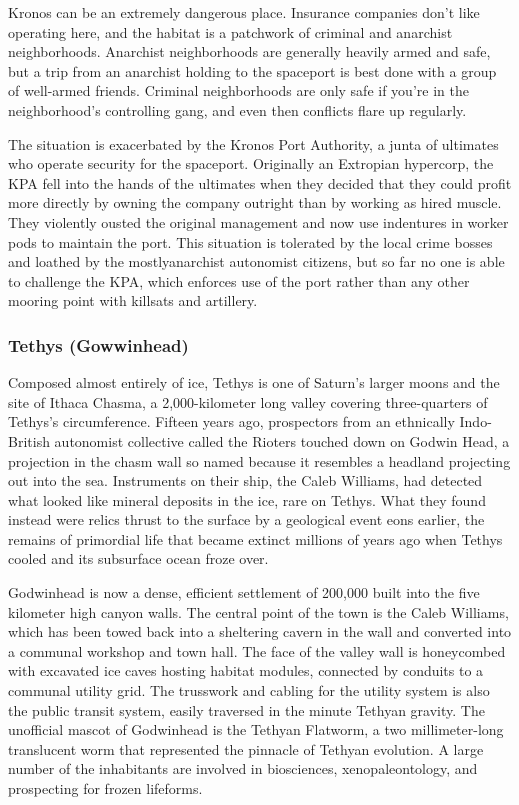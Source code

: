 Kronos can be an extremely dangerous place.  Insurance companies don't
like operating here, and the habitat is a patchwork of criminal and
anarchist neighborhoods. Anarchist neighborhoods are generally heavily
armed and safe, but a trip from an anarchist holding to the spaceport
is best done with a group of well-armed friends. Criminal
neighborhoods are only safe if you're in the neighborhood's
controlling gang, and even then conflicts flare up regularly.

The situation is exacerbated by the Kronos Port Authority, a junta of
ultimates who operate security for the spaceport. Originally an
Extropian hypercorp, the KPA fell into the hands of the ultimates when
they decided that they could profit more directly by owning the
company outright than by working as hired muscle. They violently
ousted the original management and now use indentures in worker pods
to maintain the port. This situation is tolerated by the local crime
bosses and loathed by the mostlyanarchist autonomist citizens, but so
far no one is able to challenge the KPA, which enforces use of the
port rather than any other mooring point with killsats and artillery.

\subsubsection{Tethys (Gowwinhead)}
\label{sec:tethys-gowwinhead}

Composed almost entirely of ice, Tethys is one of Saturn's larger
moons and the site of Ithaca Chasma, a 2,000-kilometer long valley
covering three-quarters of Tethys's circumference. Fifteen years ago,
prospectors from an ethnically Indo-British autonomist collective
called the Rioters touched down on Godwin Head, a projection in the
chasm wall so named because it resembles a headland projecting out
into the sea. Instruments on their ship, the Caleb Williams, had
detected what looked like mineral deposits in the ice, rare on
Tethys. What they found instead were relics thrust to the surface by a
geological event eons earlier, the remains of primordial life that
became extinct millions of years ago when Tethys cooled and its
subsurface ocean froze over.

Godwinhead is now a dense, efficient settlement of 200,000 built into
the five kilometer high canyon walls. The central point of the town is
the Caleb Williams, which has been towed back into a sheltering cavern
in the wall and converted into a communal workshop and town hall. The
face of the valley wall is honeycombed with excavated ice caves
hosting habitat modules, connected by conduits to a communal utility
grid. The trusswork and cabling for the utility system is also the
public transit system, easily traversed in the minute Tethyan
gravity. The unofficial mascot of Godwinhead is the Tethyan Flatworm,
a two millimeter-long translucent worm that represented the pinnacle
of Tethyan evolution. A large number of the inhabitants are involved
in biosciences, xenopaleontology, and prospecting for frozen
lifeforms.

